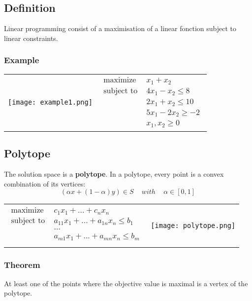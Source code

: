 \subsection{Definition}

Linear programming consist of a maximisation of a linear fonction subject to linear constraints.

\subsubsection{Example}

\begin{tabular}{m{8cm}m{5cm}}
    \texttt{[image: example1.png]}
    &
    \begin{eqnarray*}
        \textrm{maximize } & x_1 + x_2 \\
        \textrm{subject to } & 4x_1 - x_2 \leq 8 \\
                           & 2x_1 + x_2 \leq 10 \\
                            & 5x_1 - 2x_2 \geq -2\\
                            & x_1, x_2 \geq 0
        \end{eqnarray*}
\end{tabular}

\subsection{Polytope}

The solution space is a \textbf{polytope}. In a polytope, every point is a convex
combination of its vertices:
$$(\alpha x + (1 - \alpha)y) \in S \, \quad  with \quad \, \alpha \in
[0,1]$$

\begin{tabular}{m{8cm}m{4cm}}
    \begin{eqnarray*}
        \textrm{maximize } & c_1x_1 + ... + c_nx_n \\
        \textrm{subject to } & a_{11}x_1 + ... + a_{1n}x_n \leq b_1 \\
                             & ... \\
                             & a_{m1}x_1 + ... + a_{mn}x_n \leq b_m \\
        \end{eqnarray*}
        &
\texttt{[image: polytope.png]}
\end{tabular}


\subsubsection{Theorem}
At least one of the points where the objective value is maximal is a vertex of the polytope.
